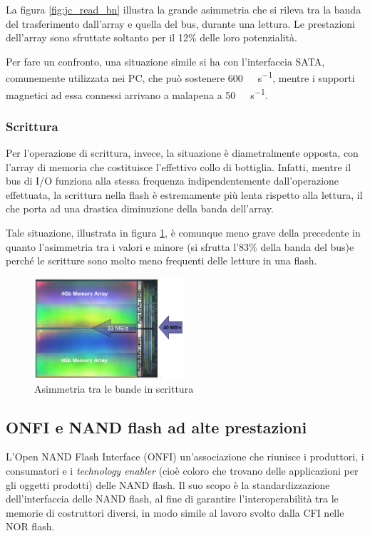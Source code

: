 \documentclass[11pt,4paper]{report}
\begin{document}
La figura \ref{fig:jc_read_bn} illustra la grande asimmetria che si rileva tra la banda del trasferimento dall'array e quella del bus, durante una lettura. Le prestazioni dell'array sono sfruttate soltanto per il 12\% delle loro potenzialità.

Per fare un confronto, una situazione simile si ha con l'interfaccia SATA, comunemente utilizzata nei PC, che può sostenere \SI{600}{\mega\byte\per\second}, mentre i supporti magnetici ad essa connessi arrivano a malapena a \SI{50}{\mega\byte\per\second}. 

\subsubsection{Scrittura}
Per l'operazione di scrittura, invece, la situazione è diametralmente opposta, con l'array di memoria che costituisce l'effettivo collo di bottiglia. Infatti, mentre il bus di I/O funziona alla stessa frequenza indipendentemente dall'operazione effettuata, la scrittura nella flash è estremamente più lenta rispetto alla lettura, il che porta ad una drastica diminuzione della banda dell'array. 

Tale situazione, illustrata in figura \ref{fig:jc_write_bn}, è comunque meno grave della precedente in quanto l'asimmetria tra i valori e minore (si sfrutta l'83\% della banda del bus)e perché le scritture sono molto meno frequenti delle letture in una flash.

\begin{figure}[hbtp]
	\centering
	\includegraphics[width=0.5\textwidth]{memorie/jc_write_bn}
	\caption{Asimmetria tra le bande in scrittura}
	\label{fig:jc_write_bn}
\end{figure}

\subsection{ONFI e NAND flash ad alte prestazioni}
L'Open NAND Flash Interface (ONFI) un'associazione che riunisce i produttori, i consumatori e i \emph{technology enabler} (cioè coloro che trovano delle applicazioni per gli oggetti prodotti) delle NAND flash. Il suo scopo è la standardizzazione dell'interfaccia delle NAND flash, al fine di garantire l'interoperabilità tra le memorie di costruttori diversi, in modo simile al lavoro svolto dalla CFI nelle NOR flash.
\end{document}
